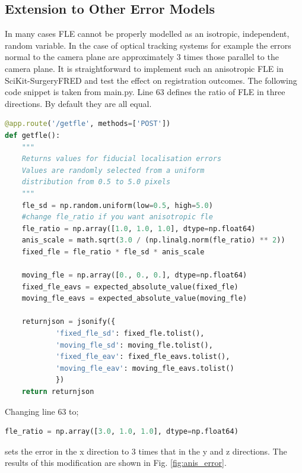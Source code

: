 \subsection{Extension to Other Error Models}
In many cases {FLE} cannot be properly modelled as an isotropic, independent, random variable. In the case of optical tracking systems for example \cite{10.1117/12.536128} the errors normal to the camera plane are approximately 3 times those parallel to the camera plane. It is straightforward to implement such an anisotropic \gls{FLE} in SciKit-SurgeryFRED and test the effect on registration outcomes.
The following code snippet is taken from  main.py. Line 63 defines the ratio of \gls{FLE} in three directions. By default they are all equal.

\begin{lstlisting}[language=python, firstnumber = 54]
@app.route('/getfle', methods=['POST'])
def getfle():
    """
    Returns values for fiducial localisation errors
    Values are randomly selected from a uniform
    distribution from 0.5 to 5.0 pixels
    """
    fle_sd = np.random.uniform(low=0.5, high=5.0)
    #change fle_ratio if you want anisotropic fle
    fle_ratio = np.array([1.0, 1.0, 1.0], dtype=np.float64)
    anis_scale = math.sqrt(3.0 / (np.linalg.norm(fle_ratio) ** 2))
    fixed_fle = fle_ratio * fle_sd * anis_scale

    moving_fle = np.array([0., 0., 0.], dtype=np.float64)
    fixed_fle_eavs = expected_absolute_value(fixed_fle)
    moving_fle_eavs = expected_absolute_value(moving_fle)

    returnjson = jsonify({
            'fixed_fle_sd': fixed_fle.tolist(),
            'moving_fle_sd': moving_fle.tolist(),
            'fixed_fle_eav': fixed_fle_eavs.tolist(),
            'moving_fle_eav': moving_fle_eavs.tolist()
            })
    return returnjson
\end{lstlisting}

Changing line 63 to;
\begin{lstlisting}[language=python, firstnumber=63]
    fle_ratio = np.array([3.0, 1.0, 1.0], dtype=np.float64)
\end{lstlisting}
sets the error in the x direction to 3 times that in the y and z directions. The results of this modification are shown in Fig. \ref{fig:anis_error}. 

